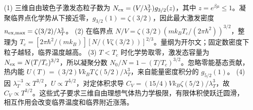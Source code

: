 (1) 三维自由玻色子激发态粒子数为 \(N_{\rm ex}=(V/\lambda_T^3)g_{3/2}(z)\)，其中 \(z=e^{\beta\mu}\le1\)。凝聚临界点化学势从下接近零，\(g_{3/2}(1)=\zeta(3/2)\)，因此最大激发密度 \(n_{\rm ex,max}=\zeta(3/2)/\lambda_T^3\)。
(2) 在临界点 \(N/V=\zeta(3/2)(mk_BT_c/(2\pi\hbar^2))^{3/2}\)，整理为 \(T_c=[2\pi\hbar^2/(mk_B)] [N/(V\zeta(3/2))]^{2/3}\)。量纲为开尔文；固定数密度下粒子越轻，临界温度越高。
(3) \(T<T_c\) 时化学势取零，激发态容量为 \(N_{\rm ex}=N(T/T_c)^{3/2}\)，所以凝聚分数 \(N_0/N=1-(T/T_c)^{3/2}\)。忽略零能基态贡献，热内能 \(U(T)=(3/2)Vk_BT\,\zeta(5/2)/\lambda_T^3\)，来自能量密度积分的 \(g_{5/2}(1)\)。
(4) 因 \(\lambda_T^{-3}\propto T^{3/2}\)，\(U\propto T^{5/2}\)，对定体积求导 \(C_V=(15/4)Vk_B\zeta(5/2)/\lambda_T^3\)，故 \(C_V\propto T^{3/2}\)。这些式子要求三维自由理想气体热力学极限，有限体积使跃迁圆滑，相互作用会改变临界温度和临界附近涨落。
